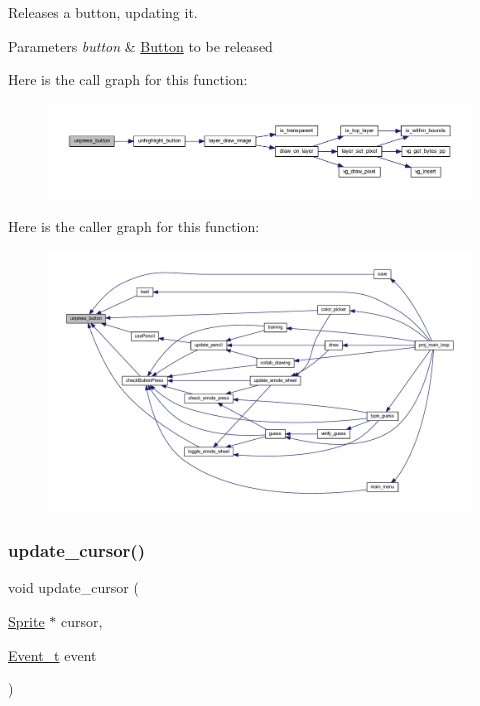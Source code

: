 Releases a button, updating it. 


\begin{DoxyParams}{Parameters}
{\em button} & \mbox{\hyperlink{struct_button}{Button}} to be released \\
\hline
\end{DoxyParams}
Here is the call graph for this function\+:\nopagebreak
\begin{figure}[H]
\begin{center}
\leavevmode
\includegraphics[width=350pt]{group__sprite_gae98d092189bc279e8a79ce65a4d7f436_cgraph}
\end{center}
\end{figure}
Here is the caller graph for this function\+:\nopagebreak
\begin{figure}[H]
\begin{center}
\leavevmode
\includegraphics[width=350pt]{group__sprite_gae98d092189bc279e8a79ce65a4d7f436_icgraph}
\end{center}
\end{figure}
\mbox{\label{group__sprite_ga90f5eec8870a027c011108bc4885880c}} 
\subsubsection{\texorpdfstring{update\+\_\+cursor()}{update\_cursor()}}
{\footnotesize\ttfamily void update\+\_\+cursor (\begin{DoxyParamCaption}\item[{\mbox{\hyperlink{struct_sprite}{Sprite}} $\ast$}]{cursor,  }\item[{\mbox{\hyperlink{struct_event__t}{Event\+\_\+t}}}]{event }\end{DoxyParamCaption})}



